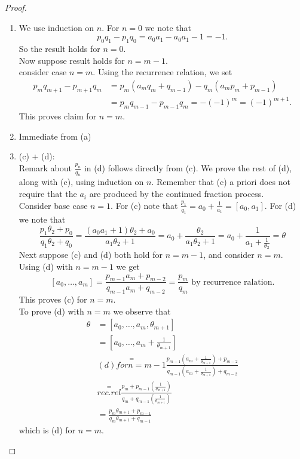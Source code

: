 \documentclass[NumTh.tex]{subfiles}
\begin{document}
\begin{proof}
  \begin{enumerate} %
    \item We use induction on $n$. For $n = 0$ we note that 
    \[ p_0 q_1 - p_1 q_0 = a_0 a_1 - a_0 a_1 - 1 = -1.\]
    So the result holds for $n = 0$.\\
    Now suppose result holds for $n = m - 1$.\\
    consider case $n = m$. Using the recurrence relation, we set
    \begin{align}
      p_m q_{m+1} - p_{m+1} q_m &= p_m (a_m q_m + q_{m-1}) - q_m ( a_m p_m + p_{m-1})\\
      &= p_m q_{m-1} - p_{m-1}q_m = - (-1)^m = (-1)^{m+1}.
    \end{align}
    This proves claim for $n = m$.
    \item Immediate from (a)
    \item (c) + (d):\\
    Remark about $\frac{p_n}{q_n}$ in (d) follows directly from (c).
    We prove the rest of (d), along with (c), using induction on $n$. Remember that (c) a priori does not require that the $a_i$ are produced by the continued fraction process.\\
    Consider base case $n = 1$. For (c) note that $\frac{p_1}{q_1} = a_0 + \frac{1}{a_1} = [a_0,a_1]$.
    For (d) we note that
    \[ \frac{p_1 \theta_2 + p_0}{q_1 \theta_2 + q_0} = \frac{(a_0 a_1 +1) \theta_2 + a_0}{a_1 \theta_2 + 1} = a_0 + \frac{\theta_2}{a_1 \theta_2 +1} = a_0 + \frac{1}{a_1 + \frac{1}{\theta_2}} = \theta \]
    Next suppose (c) and (d) both hold for $n = m-1$, and consider $n = m$. Using (d)  with $n = m -1$ we get
    \[ [a_0, \dots, a_m ] = \frac{p_{m-1} a_m + p_{m-2}}{q_{m-1} a_m + q_{m-2}} = \frac{p_m}{q_m} \text{ by recurrence ralation.} \]
    This proves (c) for $n=m$.\\
    To prove (d) with $n=m$ we observe that
    \begin{align}
      \theta &= [a_0,\dots,a_m,\theta_{m+1} ] \\
      &= [a_0,\dots,a_m + \frac{1}{\theta_{m+1}} ]\\
      &\overset{=}{(d) for n=m-1} \frac{p_{m-1} (a_m + \frac{1}{\theta_{m+1}} ) + p_{m-2}}{q_{m-1} (a_m + \frac{1}{\theta_{m+1}} ) + q_{m-2}}\\
      &\overset{=}{rec. rel} \frac{p_m + p_{m-1} (\frac{1}{\theta_{m+1}})}{q_m + q_{m-1} ( \frac{1}{\theta_{m+1}})}\\
      &= \frac{p_m \theta_{m+1} + p_{m-1}}{q_m \theta_{m+1} + q_{m-1}}
    \end{align}
    which is (d) for $n=m$.
  \end{enumerate}
\end{proof}
\end{document}

